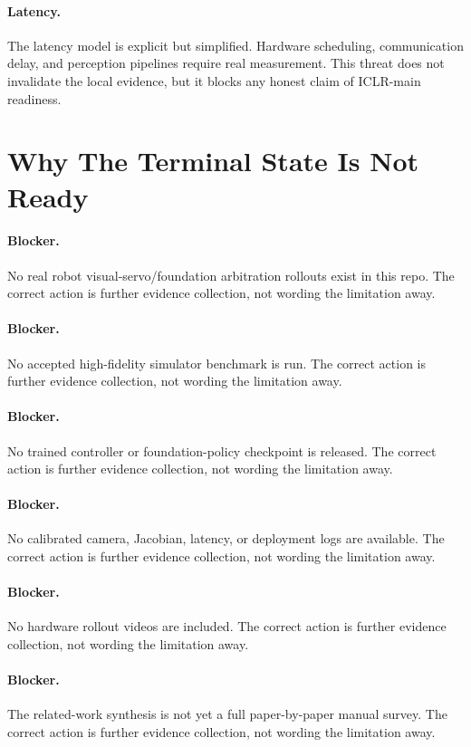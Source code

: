 \documentclass{article}
\begin{document}
\paragraph{Latency.} The latency model is explicit but simplified. Hardware scheduling, communication delay, and perception pipelines require real measurement. This threat does not invalidate the local evidence, but it blocks any honest claim of ICLR-main readiness.
\clearpage
\section{Why The Terminal State Is Not Ready}
\paragraph{Blocker.} No real robot visual-servo/foundation arbitration rollouts exist in this repo. The correct action is further evidence collection, not wording the limitation away.
\paragraph{Blocker.} No accepted high-fidelity simulator benchmark is run. The correct action is further evidence collection, not wording the limitation away.
\paragraph{Blocker.} No trained controller or foundation-policy checkpoint is released. The correct action is further evidence collection, not wording the limitation away.
\paragraph{Blocker.} No calibrated camera, Jacobian, latency, or deployment logs are available. The correct action is further evidence collection, not wording the limitation away.
\paragraph{Blocker.} No hardware rollout videos are included. The correct action is further evidence collection, not wording the limitation away.
\paragraph{Blocker.} The related-work synthesis is not yet a full paper-by-paper manual survey. The correct action is further evidence collection, not wording the limitation away.
\end{document}
